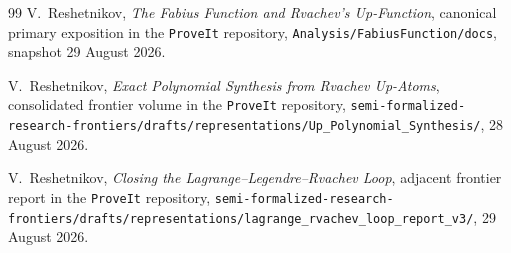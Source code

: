 \documentclass[11pt,oneside]{article}
\numberwithin{equation}{section}
\theoremstyle{definition}
\theoremstyle{remark}
\newcommand{\repo}{\nolinkurl{Analysis/FabiusFunction/docs}}
\begin{document}
\begin{thebibliography}{99}
V.~Reshetnikov,
\newblock \emph{The Fabius Function and Rvachev's Up-Function},
\newblock canonical primary exposition in the \texttt{ProveIt} repository,
\repo, snapshot 29 August 2026.

V.~Reshetnikov,
\newblock \emph{Exact Polynomial Synthesis from Rvachev Up-Atoms},
\newblock consolidated frontier volume in the \texttt{ProveIt} repository,
\nolinkurl{semi-formalized-research-frontiers/drafts/representations/Up_Polynomial_Synthesis/},
28 August 2026.

V.~Reshetnikov,
\newblock \emph{Closing the Lagrange--Legendre--Rvachev Loop},
\newblock adjacent frontier report in the \texttt{ProveIt} repository,
\nolinkurl{semi-formalized-research-frontiers/drafts/representations/lagrange_rvachev_loop_report_v3/},
29 August 2026.

\end{thebibliography}
\end{document}
